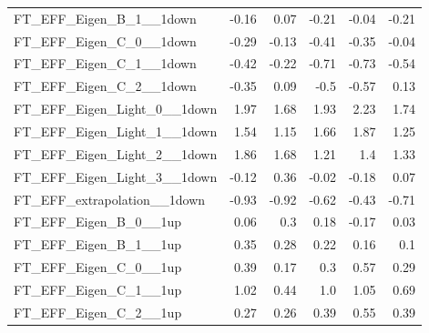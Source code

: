 \begin{table}[htbp]
{\begin{tabular}{lrrrrr}
FT\_EFF\_Eigen\_B\_1\_\_1down      & -0.16              & 0.07                 & -0.21                & -0.04                & -0.21                \\
FT\_EFF\_Eigen\_C\_0\_\_1down      & -0.29              & -0.13                & -0.41                & -0.35                & -0.04                \\
FT\_EFF\_Eigen\_C\_1\_\_1down      & -0.42              & -0.22                & -0.71                & -0.73                & -0.54                \\
FT\_EFF\_Eigen\_C\_2\_\_1down      & -0.35              & 0.09                 & -0.5                 & -0.57                & 0.13                 \\
FT\_EFF\_Eigen\_Light\_0\_\_1down  & 1.97               & 1.68                 & 1.93                 & 2.23                 & 1.74                 \\
FT\_EFF\_Eigen\_Light\_1\_\_1down  & 1.54               & 1.15                 & 1.66                 & 1.87                 & 1.25                 \\
FT\_EFF\_Eigen\_Light\_2\_\_1down  & 1.86               & 1.68                 & 1.21                 & 1.4                  & 1.33                 \\
FT\_EFF\_Eigen\_Light\_3\_\_1down  & -0.12              & 0.36                 & -0.02                & -0.18                & 0.07                 \\
FT\_EFF\_extrapolation\_\_1down    & -0.93              & -0.92                & -0.62                & -0.43                & -0.71                \\
FT\_EFF\_Eigen\_B\_0\_\_1up        & 0.06               & 0.3                  & 0.18                 & -0.17                & 0.03                 \\
FT\_EFF\_Eigen\_B\_1\_\_1up        & 0.35               & 0.28                 & 0.22                 & 0.16                 & 0.1                  \\
FT\_EFF\_Eigen\_C\_0\_\_1up        & 0.39               & 0.17                 & 0.3                  & 0.57                 & 0.29                 \\
FT\_EFF\_Eigen\_C\_1\_\_1up        & 1.02               & 0.44                 & 1.0                  & 1.05                 & 0.69                 \\
FT\_EFF\_Eigen\_C\_2\_\_1up        & 0.27               & 0.26                 & 0.39                 & 0.55                 & 0.39                 \\

\end{tabular}}
\end{table}
